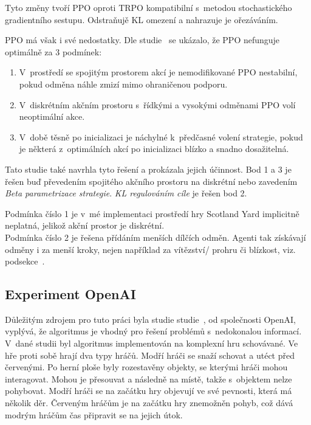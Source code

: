 Tyto změny tvoří PPO oproti TRPO kompatibilní s~metodou stochastického gradientního sestupu.
Odstraňujě KL omezení a nahrazuje je ořezáváním.

PPO má však i své nedostatky.
\label{PPO_weakness}
Dle studie~\cite{PPO_weakness} se ukázalo, že PPO nefunguje optimálně za 3 podmínek:
\begin{enumerate}
  \item V~prostředí se spojitým prostorem akcí je nemodifikované PPO nestabilní, pokud odměna náhle zmizí mimo ohraničenou podporu.
  \item V~diskrétním akčním prostoru s~řídkými a vysokými odměnami PPO volí neoptimální akce.
  \item V~době těsně po inicializaci je náchylné k~předčasné volení strategie, pokud je některá z~optimálních akcí po inicializaci blízko a snadno dosažitelná.
\end{enumerate}

Tato studie také navrhla tyto řešení a prokázala jejich účinnost.
Bod 1 a 3 je řešen buď převedením spojitého akčního prostoru na diskrétní nebo zavedením \emph{Beta parametrizace strategie}.
\emph{KL regulováním cíle} je řešen bod 2.

Podmínka číslo 1 je v~mé implementaci prostředí hry Scotland Yard implicitně neplatná, jelikož akční prostor je diskrétní.\\
Podmínka číslo 2 je řešena přídáním menších dílčích odměn.
Agenti tak získávají odměny i za menší kroky, nejen například za vítězství/ prohru či blízkost, viz. podsekce~.\\
\subsection{Experiment OpenAI}\label{subsec:experiment-openai}
Důležitým zdrojem pro tuto práci byla studie studie~\cite{PPO_Hide_Seek_paper}, od společnosti OpenAI, vyplývá, že algoritmus je vhodný pro řešení problémů s~nedokonalou informací.
V~dané studii byl algoritmus implementován na komplexní hru schovávané.
Ve hře proti sobě hrají dva typy hráčů.
Modří hráči se snaží schovat a utéct před červenými.
Po herní ploše byly rozestavěny objekty, se kterými hráči mohou interagovat.
Mohou je přesouvat a následně  na místě, takže s~objektem nelze pohybovat.
Modří hráči se na začátku hry objevují ve své pevnosti, která má několik děr.
Červeným hráčům je na začátku hry znemožněn pohyb, což dává modrým hráčům čas připravit se na jejich útok.

